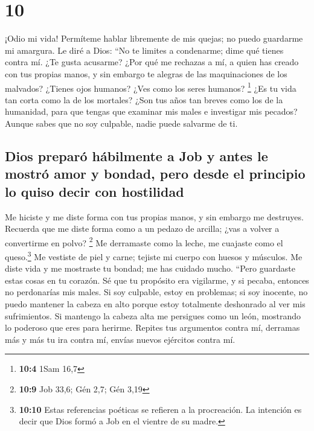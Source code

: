 \hypertarget{section-9}{%
\section{10}\label{section-9}}

 ¡Odio mi vida! Permíteme hablar libremente de mis quejas;
no puedo guardarme mi amargura.  Le diré a Dios: ``No te
limites a condenarme; dime qué tienes contra mí.  ¿Te
gusta acusarme? ¿Por qué me rechazas a mí, a quien has creado con tus
propias manos, y sin embargo te alegras de las maquinaciones de los
malvados?  ¿Tienes ojos humanos? ¿Ves como los seres
humanos? \footnote{\textbf{10:4} 1Sam 16,7}  ¿Es tu vida
tan corta como la de los mortales? ¿Son tus años tan breves como los de
la humanidad,  para que tengas que examinar mis males e
investigar mis pecados?  Aunque sabes que no soy culpable,
nadie puede salvarme de ti.

\hypertarget{dios-preparuxf3-huxe1bilmente-a-job-y-antes-le-mostruxf3-amor-y-bondad-pero-desde-el-principio-lo-quiso-decir-con-hostilidad}{%
\subsection{Dios preparó hábilmente a Job y antes le mostró amor y
bondad, pero desde el principio lo quiso decir con
hostilidad}\label{dios-preparuxf3-huxe1bilmente-a-job-y-antes-le-mostruxf3-amor-y-bondad-pero-desde-el-principio-lo-quiso-decir-con-hostilidad}}

 Me hiciste y me diste forma con tus propias manos, y sin
embargo me destruyes.  Recuerda que me diste forma como a
un pedazo de arcilla; ¿vas a volver a convertirme en polvo? \footnote{\textbf{10:9}
  Job 33,6; Gén 2,7; Gén 3,19}  Me derramaste como la
leche, me cuajaste como el queso.\footnote{\textbf{10:10} Estas
  referencias poéticas se refieren a la procreación. La intención es
  decir que Dios formó a Job en el vientre de su madre.} 
Me vestiste de piel y carne; tejiste mi cuerpo con huesos y músculos.
 Me diste vida y me mostraste tu bondad; me has cuidado
mucho.  ``Pero guardaste estas cosas en tu corazón. Sé
que tu propósito era  vigilarme, y si pecaba, entonces no
perdonarías mis males.  Si soy culpable, estoy en
problemas; si soy inocente, no puedo mantener la cabeza en alto porque
estoy totalmente deshonrado al ver mis sufrimientos.  Si
mantengo la cabeza alta me persigues como un león, mostrando lo poderoso
que eres para herirme.  Repites tus argumentos contra mí,
derramas más y más tu ira contra mí, envías nuevos ejércitos contra mí.

